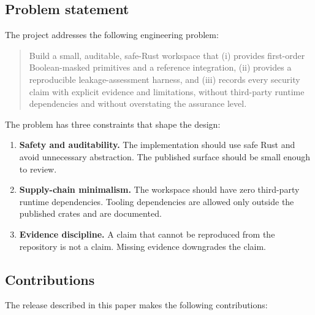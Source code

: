\documentclass[11pt,a4paper]{article}
\theoremstyle{plain}
\theoremstyle{definition}
\theoremstyle{remark}
\begin{document}
\subsection{Problem statement}

The project addresses the following engineering problem:

\begin{quote}
Build a small, auditable, safe-Rust workspace that (i) provides first-order
Boolean-masked primitives and a reference integration, (ii) provides a reproducible
leakage-assessment harness, and (iii) records every security claim with explicit
evidence and limitations, without third-party runtime dependencies and without
overstating the assurance level.
\end{quote}

The problem has three constraints that shape the design:

\begin{enumerate}[leftmargin=1.5em]
  \item \textbf{Safety and auditability.} The implementation should use safe Rust and
        avoid unnecessary abstraction. The published surface should be small enough to
        review.
  \item \textbf{Supply-chain minimalism.} The workspace should have zero third-party
        runtime dependencies. Tooling dependencies are allowed only outside the
        published crates and are documented.
  \item \textbf{Evidence discipline.} A claim that cannot be reproduced from the
        repository is not a claim. Missing evidence downgrades the claim.
\end{enumerate}

\subsection{Contributions}

The release described in this paper makes the following contributions:
\end{document}
